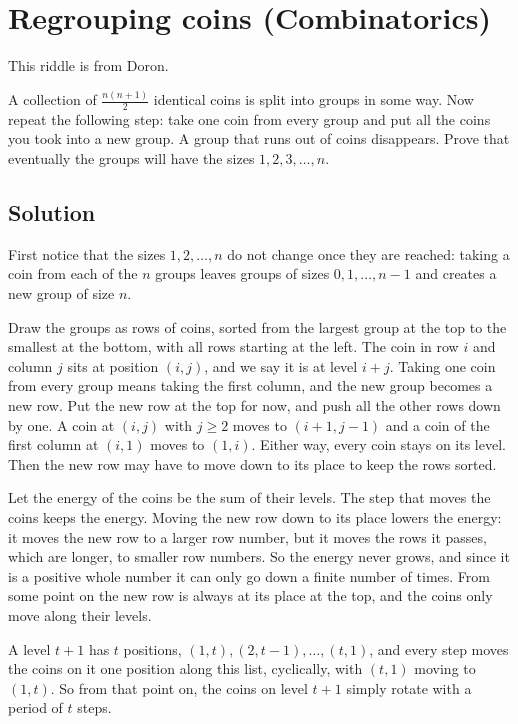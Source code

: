 \section {Regrouping coins (Combinatorics)}

This riddle is from Doron.

A collection of $\frac{n(n+1)}{2}$ identical coins is split into groups in some way.
Now repeat the following step: take one coin from every group and put all the coins you took into a new group.
A group that runs out of coins disappears.
Prove that eventually the groups will have the sizes $1, 2, 3, \ldots, n$.

\subsection{Solution}

First notice that the sizes $1, 2, \ldots, n$ do not change once they are reached: taking a coin from each of the $n$ groups
leaves groups of sizes $0, 1, \ldots, n-1$ and creates a new group of size $n$.

Draw the groups as rows of coins, sorted from the largest group at the top to the smallest at the bottom,
with all rows starting at the left. The coin in row $i$ and column $j$ sits at position $(i,j)$, and we say it is at level $i+j$.
Taking one coin from every group means taking the first column, and the new group becomes a new row.
Put the new row at the top for now, and push all the other rows down by one.
A coin at $(i,j)$ with $j \ge 2$ moves to $(i+1, j-1)$ and a coin of the first column at $(i,1)$ moves to $(1,i)$.
Either way, every coin stays on its level.
Then the new row may have to move down to its place to keep the rows sorted.

Let the energy of the coins be the sum of their levels. The step that moves the coins keeps the energy.
Moving the new row down to its place lowers the energy: it moves the new row to a larger row number,
but it moves the rows it passes, which are longer, to smaller row numbers. So the energy never grows,
and since it is a positive whole number it can only go down a finite number of times.
From some point on the new row is always at its place at the top, and the coins only move along their levels.

A level $t+1$ has $t$ positions, $(1,t), (2,t-1), \ldots, (t,1)$, and every step moves the coins on it one position along this list,
cyclically, with $(t,1)$ moving to $(1,t)$.
So from that point on, the coins on level $t+1$ simply rotate with a period of $t$ steps.

